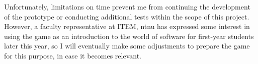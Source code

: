 \noindent
Unfortunately, limitations on time prevent me from continuing the development of the prototype or conducting additional tests within the scope of this project. However, a faculty representative at ITEM, \gls{ntnu} has expressed some interest in using the game as an introduction to the world of software for first-year students later this year, so I will eventually make some adjustments to prepare the game for this purpose, in case it becomes relevant.
